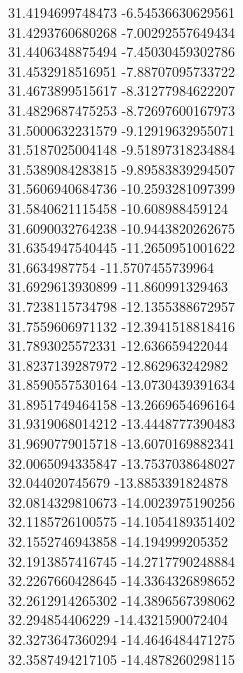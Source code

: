 {31.4194699748473	-6.54536630629561\\
31.4293760680268	-7.00292557649434\\
31.4406348875494	-7.45030459302786\\
31.4532918516951	-7.88707095733722\\
31.4673899515617	-8.31277984622207\\
31.4829687475253	-8.72697600167973\\
31.5000632231579	-9.12919632955071\\
31.5187025004148	-9.51897318234884\\
31.5389084283815	-9.89583839294507\\
31.5606940684736	-10.2593281097399\\
31.5840621115458	-10.608988459124\\
31.6090032764238	-10.9443820262675\\
31.6354947540445	-11.2650951001622\\
31.6634987754	-11.5707455739964\\
31.6929613930899	-11.860991329463\\
31.7238115734798	-12.1355388672957\\
31.7559606971132	-12.3941518818416\\
31.7893025572331	-12.636659422044\\
31.8237139287972	-12.862963242982\\
31.8590557530164	-13.0730439391634\\
31.8951749464158	-13.2669654696164\\
31.9319068014212	-13.4448777390483\\
31.9690779015718	-13.6070169882341\\
32.0065094335847	-13.7537038648027\\
32.044020745679	-13.8853391824878\\
32.0814329810673	-14.0023975190256\\
32.1185726100575	-14.1054189351402\\
32.1552746943858	-14.194999205352\\
32.1913857416745	-14.2717790248884\\
32.2267660428645	-14.3364326898652\\
32.2612914265302	-14.3896567398062\\
32.294854406229	-14.4321590072404\\
32.3273647360294	-14.4646484471275\\
32.3587494217105	-14.4878260298115\\
}
